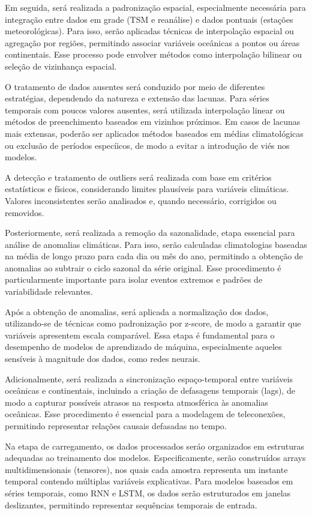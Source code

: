 	Em seguida, será realizada a padronização espacial, especialmente necessária para integração entre dados em grade (TSM e reanálise) e dados pontuais (estações meteorológicas).
	Para isso, serão aplicadas técnicas de interpolação espacial ou agregação por regiões, permitindo associar variáveis oceânicas a pontos ou áreas continentais.
	Esse processo pode envolver métodos como interpolação bilinear ou seleção de vizinhança espacial. 

	O tratamento de dados ausentes será conduzido por meio de diferentes estratégias, dependendo da natureza e extensão das lacunas.
	Para séries temporais com poucos valores ausentes, será utilizada interpolação linear ou métodos de preenchimento baseados em vizinhos próximos.
	Em casos de lacunas mais extensas, poderão ser aplicados métodos baseados em médias climatológicas ou exclusão de períodos especíicos, de modo a evitar a introdução de viés nos modelos.

	A detecção e tratamento de outliers será realizada com base em critérios estatísticos e físicos, considerando limites plausíveis para variáveis climáticas.
	Valores inconsistentes serão analisados e, quando necessário, corrigidos ou removidos.

	Posteriormente, será realizada a remoção da sazonalidade, etapa essencial para análise de anomalias climáticas. 
	Para isso, serão calculadas climatologias baseadas na média de longo prazo para cada dia ou mês do ano, permitindo a obtenção de anomalias ao subtrair o ciclo sazonal da série original.
	Esse procedimento é particularmente importante para isolar eventos extremos e padrões de variabilidade relevantes.

	Após a obtenção de anomalias, será aplicada a normalização dos dados, utilizando-se de técnicas como padronização por z-score, de modo a garantir que variáveis apresentem escala comparável.
	Essa etapa é fundamental para o desempenho de modelos de aprendizado de máquina, especialmente aqueles sensíveis à magnitude dos dados, como redes neurais.

	Adicionalmente, será realizada a sincronização espaço-temporal entre variáveis oceânicas e continentais, incluindo a criação de defasagens temporais (lags), de modo a capturar possíveis atrasos na resposta atmosférica às anomalias oceânicas.
	Esse procedimento é essencial para a modelagem de teleconexões, permitindo representar relações causais defasadas no tempo. 

	Na etapa de carregamento, os dados processados seráo organizados em estruturas adequadas ao treinamento dos modelos. Especificamente, serão construídos arrays multidimensionais (tensores), nos quais cada amostra representa um instante temporal contendo múltiplas variáveis explicativas.
	Para modelos baseados em séries temporais, como RNN e LSTM, os dados serão estruturados em janelas deslizantes, permitindo representar sequências temporais de entrada.

